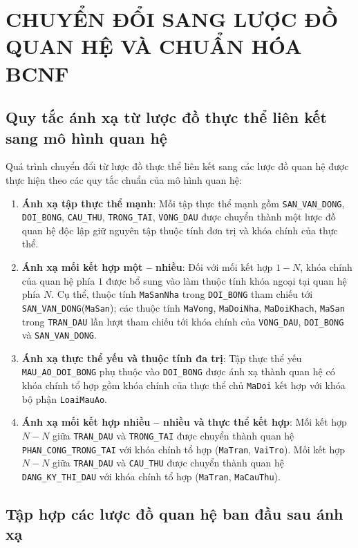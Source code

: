 \chapter{CHUYỂN ĐỔI SANG LƯỢC ĐỒ QUAN HỆ VÀ CHUẨN HÓA BCNF}

\section{Quy tắc ánh xạ từ lược đồ thực thể liên kết sang mô hình quan hệ}

Quá trình chuyển đổi từ lược đồ thực thể liên kết sang các lược đồ quan hệ được thực hiện theo các quy tắc chuẩn của mô hình quan hệ:
\begin{enumerate}
    \item \textbf{Ánh xạ tập thực thể mạnh}: Mỗi tập thực thể mạnh gồm \texttt{SAN\_VAN\_DONG}, \texttt{DOI\_BONG}, \texttt{CAU\_THU}, \texttt{TRONG\_TAI}, \texttt{VONG\_DAU} được chuyển thành một lược đồ quan hệ độc lập giữ nguyên tập thuộc tính đơn trị và khóa chính của thực thể.
    \item \textbf{Ánh xạ mối kết hợp một -- nhiều}: Đối với mối kết hợp $1 - N$, khóa chính của quan hệ phía $1$ được bổ sung vào làm thuộc tính khóa ngoại tại quan hệ phía $N$. Cụ thể, thuộc tính \texttt{MaSanNha} trong \texttt{DOI\_BONG} tham chiếu tới \texttt{SAN\_VAN\_DONG}(\texttt{MaSan}); các thuộc tính \texttt{MaVong}, \texttt{MaDoiNha}, \texttt{MaDoiKhach}, \texttt{MaSan} trong \texttt{TRAN\_DAU} lần lượt tham chiếu tới khóa chính của \texttt{VONG\_DAU}, \texttt{DOI\_BONG} và \texttt{SAN\_VAN\_DONG}.
    \item \textbf{Ánh xạ thực thể yếu và thuộc tính đa trị}: Tập thực thể yếu \texttt{MAU\_AO\_DOI\_BONG} phụ thuộc vào \texttt{DOI\_BONG} được ánh xạ thành quan hệ có khóa chính tổ hợp gồm khóa chính của thực thể chủ \texttt{MaDoi} kết hợp với khóa bộ phận \texttt{LoaiMauAo}.
    \item \textbf{Ánh xạ mối kết hợp nhiều -- nhiều và thực thể kết hợp}: Mối kết hợp $N - N$ giữa \texttt{TRAN\_DAU} và \texttt{TRONG\_TAI} được chuyển thành quan hệ \texttt{PHAN\_CONG\_TRONG\_TAI} với khóa chính tổ hợp (\texttt{MaTran}, \texttt{VaiTro}). Mối kết hợp $N - N$ giữa \texttt{TRAN\_DAU} và \texttt{CAU\_THU} được chuyển thành quan hệ \texttt{DANG\_KY\_THI\_DAU} với khóa chính tổ hợp (\texttt{MaTran}, \texttt{MaCauThu}).
\end{enumerate}

\section{Tập hợp các lược đồ quan hệ ban đầu sau ánh xạ}

